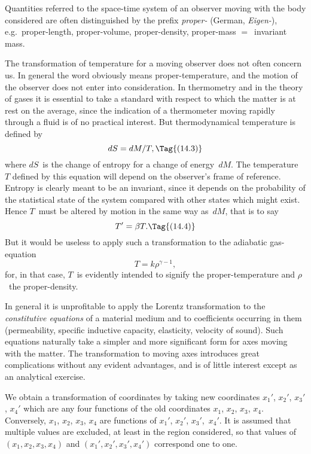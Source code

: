 \documentclass[12pt]{book}
\begin{document}
Quantities referred to the space-time system of an observer moving with
%
the body considered are often distinguished by the prefix \emph{proper-} (German,
\emph{Eigen-}), e.g.\ proper\hyp{}length, proper\hyp{}volume, proper\hyp{}density, proper\hyp{}mass $=$~invariant
mass.

The transformation of temperature for a moving observer does not often
%
concern us. In general the word obviously means proper\hyp{}temperature, and
the motion of the observer does not enter into consideration. In thermometry
and in the theory of gases it is essential to take a standard with respect to
which the matter is at rest on the average, since the indication of a thermometer
moving rapidly through a fluid is of no practical interest. But
thermodynamical temperature is defined by
\[
dS = dM/T,
\Tag{(14.3)}
\]
where $dS$~is the change of entropy for a change of energy~$dM$. The temperature~$T$
%
defined by this equation will depend on the observer's frame of
reference. Entropy is clearly meant to be an invariant, since it depends on
the probability of the statistical state of the system compared with other
states which might exist. Hence $T$~must be altered by motion in the same
way as~$dM$, that is to say
\[
T' = \beta T.
\Tag{(14.4)}
\]
But it would be useless to apply such a transformation to the adiabatic gas\hyp{}equation
\[
T = k\rho^{\gamma-1},
\]
for, in that case, $T$~is evidently intended to signify the proper\hyp{}temperature and
$\rho$~the proper\hyp{}density.

In general it is unprofitable to apply the Lorentz transformation to the
\emph{constitutive equations} of a material medium and to coefficients occurring in
%
them (permeability, specific inductive capacity, elasticity, velocity of sound).
Such equations naturally take a simpler and more significant form for axes
moving with the matter. The transformation to moving axes introduces great
complications without any evident advantages, and is of little interest except
as an analytical exercise.

%

We obtain a transformation of coordinates by taking new coordinates
%
$x_{1}'$, $x_{2}'$, $x_{3}'$, $x_{4}'$ which are any four functions of the old coordinates $x_{1}$, $x_{2}$, $x_{3}$, $x_{4}$.
Conversely, $x_{1}$, $x_{2}$, $x_{3}$, $x_{4}$ are functions of $x_{1}'$, $x_{2}'$, $x_{3}'$,~$x_{4}'$. It is assumed that
multiple values are excluded, at least in the region considered, so that values
of $(x_{1}, x_{2}, x_{3}, x_{4})$ and $(x_{1}', x_{2}', x_{3}', x_{4}')$ correspond one to one.
\end{document}
